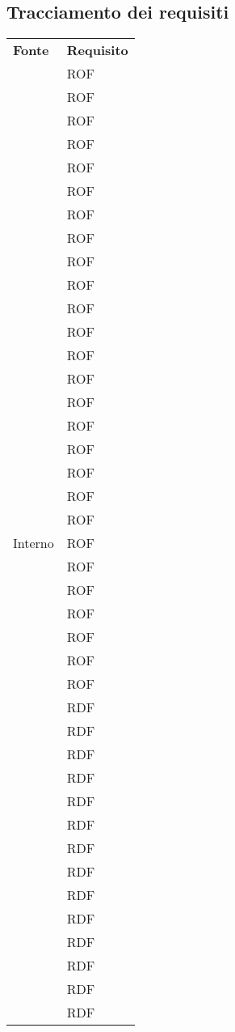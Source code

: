 \subsection{Tracciamento dei requisiti}
\begin{longtable}{| p{5cm} | p{5cm} |}
		\rowcolor{LightBlue}
		\color{white}\bfseries Fonte & \color{white}\bfseries Requisito \\[0.25cm]
\multirow[t]{61}{*}{Interno}		
				& 	ROF \\
				&	ROF \\
				&	ROF \\
				&	ROF \\
				&	ROF \\
				&	ROF \\
				&	ROF \\
				&	ROF \\
				&	ROF \\
				&	ROF \\
				&	ROF \\
				&	ROF \\
				&	ROF \\
				&	ROF \\
				&	ROF \\
				& 	ROF \\
				& 	ROF \\
				& 	ROF \\
				& 	ROF \\
				& 	ROF \\
				& 	ROF \\
				& 	ROF \\
				& 	ROF \\
				& 	ROF \\
				& 	ROF \\
				& 	ROF \\
				& 	ROF \\
				&	RDF \\
				&	RDF \\
				&	RDF \\
				&	RDF \\
				&	RDF \\
				&	RDF \\
				&	RDF \\
				&	RDF \\
				&	RDF \\
				&	RDF \\
				&	RDF \\
				&	RDF \\
				&	RDF \\
				&	RDF \\

\end{longtable}
